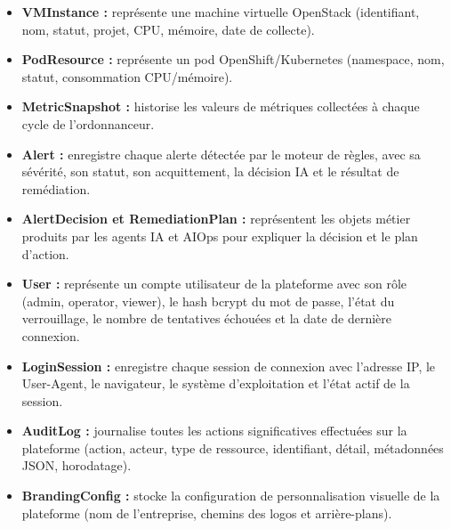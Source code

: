 \documentclass[11pt,a4paper]{report}
\begin{document}
\begin{itemize}[label=\textbullet, leftmargin=1.5cm, labelsep=0.5cm,
                itemsep=0.4em, parsep=0em, topsep=0.4em]

    \item \textbf{VMInstance :} représente une machine virtuelle OpenStack
    (identifiant, nom, statut, projet, CPU, mémoire, date de collecte).

    \item \textbf{PodResource :} représente un pod OpenShift/Kubernetes
    (namespace, nom, statut, consommation CPU/mémoire).

    \item \textbf{MetricSnapshot :} historise les valeurs de métriques
    collectées à chaque cycle de l'ordonnanceur.

    \item \textbf{Alert :} enregistre chaque alerte détectée par le moteur de
    règles, avec sa sévérité, son statut, son acquittement, la décision IA et
    le résultat de remédiation.

    \item \textbf{AlertDecision et RemediationPlan :} représentent les objets
    métier produits par les agents IA et AIOps pour expliquer la décision et
    le plan d'action.

    \item \textbf{User :} représente un compte utilisateur de la plateforme
    avec son rôle (admin, operator, viewer), le hash bcrypt du mot de passe,
    l'état du verrouillage, le nombre de tentatives échouées et la date de
    dernière connexion.

    \item \textbf{LoginSession :} enregistre chaque session de connexion avec
    l'adresse IP, le User-Agent, le navigateur, le système d'exploitation et
    l'état actif de la session.

    \item \textbf{AuditLog :} journalise toutes les actions significatives
    effectuées sur la plateforme (action, acteur, type de ressource,
    identifiant, détail, métadonnées JSON, horodatage).

    \item \textbf{BrandingConfig :} stocke la configuration de personnalisation
    visuelle de la plateforme (nom de l'entreprise, chemins des logos et
    arrière-plans).

\end{itemize}
\end{document}
